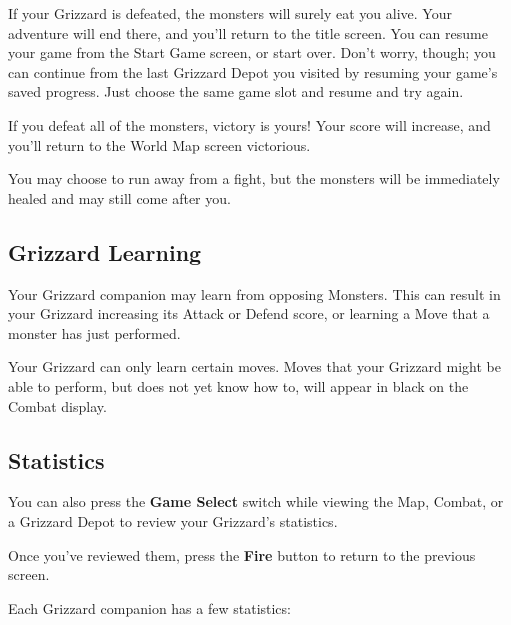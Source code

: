 \documentclass[10pt,twocolumn,openany,article]{memoir}
\begin{document}
If your  Grizzard is defeated, the  monsters will surely eat  you alive.
Your adventure will end there, and you'll return to the title screen.
\ifdefined\NOSAVE
You can  resume your  game from  the Start Game  screen, or  start over.
\else
Don't worry, though;  you can continue from the last  Grizzard Depot you
visited by  resuming your  game's saved progress.  Just choose  the same
game slot and resume and try again.
\fi

If you  defeat all of  the monsters, victory  is yours! Your  score will
increase, and you'll return to the World Map screen victorious.

You  may choose  to run  away from  a fight,  but the  monsters will  be
immediately healed and may still come after you.

\subsection{Grizzard Learning}

Your  Grizzard companion  may  learn from  opposing  Monsters. This  can
result  in your  Grizzard  increasing  its Attack  or  Defend score,  or
learning a Move that a monster has just performed.

Your Grizzard  can only  learn certain moves.  Moves that  your Grizzard
might be able to  perform, but does not yet know how  to, will appear in
black on the Combat display.

\subsection{Statistics}

You can  also press  the \textbf{Game Select}  switch while  viewing the
Map, Combat, or a Grizzard Depot to review your Grizzard's statistics.

Once  you've reviewed  them,  press the  \textbf{Fire} button  to  return to  the
previous screen.

Each Grizzard companion has a few statistics:
\end{document}

